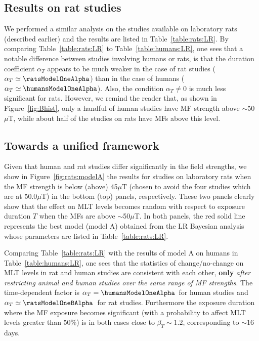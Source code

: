 \documentclass[letter,twoside]{article}
\begin{document}
\subsection*{Results on rat studies}
\label{section:results:rats}

We performed a similar analysis on the  studies available on laboratory rats (described earlier) and the results are listed  in  Table~\ref{table:rats:LR}. By comparing Table~\ref{table:rats:LR} to Table~\ref{table:humans:LR}, one sees that a notable difference  between studies involving humans or rats, is that the duration coefficient $\alpha_T$
 appears to be much weaker in the case of rat studies ($\alpha_T\simeq \ratsModelOneAlpha$) than in the case of humans ($\alpha_T\simeq \humansModelOneAlpha$). Also, the condition $\alpha_T\neq0$ is much less significant  for rats.
However, we remind the reader that, as shown in Figure~\ref{fig:Bhist}, only a handful of human studies  have MF strength above $
\sim$50 $\mu$T, while about half of the studies on rats have MFs above this level.


\subsection*{Towards a unified framework} 
\label{section:results:bimodal}

Given that human and rat studies differ significantly in the field strengths,  we show  in Figure~\ref{fig:rats:modelA}  the results for studies on laboratory rats when the MF strength is below (above)  45$\mu$T (chosen to avoid the four studies which are at 50.0$\mu$T)   in the bottom (top) panels, respectively. 
These two panels clearly show that the effect on MLT levels becomes  random with respect to exposure duration $T$ when the MFs are above $\sim$50$\mu$T.
In both panels, the red solid line represents the best  model (model A) obtained from the LR Bayesian analysis whose parameters are listed in Table~\ref{table:rats:LR}.


Comparing Table~\ref{table:rats:LR} with the results of model A on humans in Table~\ref{table:humans:LR},
one sees that  the statistics of change/no-change on MLT levels in
 rat and human studies are consistent with each other,  {\bf only} {\it after restricting animal and human studies over the same range of MF strengths}.
The time-dependent factor  is $\alpha_T=\humansModelOneAlpha$\humansModelOneAlphaErr\ for human studies and $\alpha_T\simeq\ratsModelOneBAlpha$\ratsModelOneBAlphaErr\ for rat studies. 
 Furthermore the exposure duration where the MF exposure  becomes significant (with a probability to affect MLT levels greater than 50\%) is in both cases close to $\beta_T\sim1.2$, corresponding to  $\sim16$ days.
\end{document}

